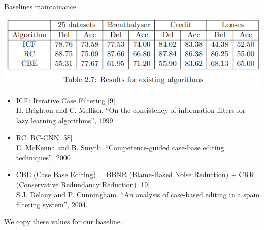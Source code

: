 \documentclass[]{beamer}
\begin{document}
\begin{frame}{Baselines maintainance}
    \begin{center}
        \includegraphics[width=.9\textwidth]{tab2_7.png}
    \end{center}
    
    \begin{itemize}
        \item ICF:  Iterative Case Filtering [9]\\
        {\smaller H. Brighton and C. Mellish. ``On the consistency of information filters for lazy learning algorithms'', 1999}
        \item RC:  RC-CNN [58]\\
        {\smaller E. McKenna and B. Smyth. ``Competence-guided case-base editing techniques'', 2000}
        \item CBE (Case Base Editing) = BBNR (Blame-Based Noise Reduction) + CRR (Conservative Redundancy Reduction) [19]\\
        {\smaller S.J. Delany and P. Cunningham. ``An analysis of case-based editing in a spam filtering system'', 2004.}
    \end{itemize}

    We copy these values for our baseline.
\end{frame}
\end{document}
